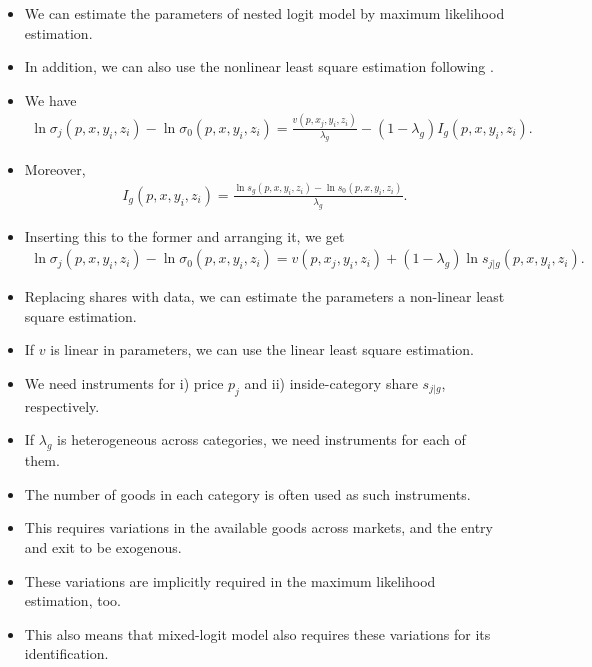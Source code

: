 \documentclass[
]{book}
\providecommand{\tightlist}{%
  \setlength{\itemsep}{0pt}\setlength{\parskip}{0pt}}
\begin{document}
\begin{itemize}
\tightlist
\item
  We can estimate the parameters of nested logit model by maximum likelihood estimation.
\item
  In addition, we can also use the nonlinear least square estimation following \citet{berryEstimatingDiscreteChoiceModels1994}.
\item
  We have
  \begin{equation}
  \begin{split}
  \ln \sigma_{j}(p, x, y_i, z_i) - \ln \sigma_{0}(p, x, y_i, z_i) = \frac{v(p, x_j, y_i, z_i)}{\lambda_g} - (1 - \lambda_g) I_g(p, x, y_i, z_i).
  \end{split}
  \end{equation}
\item
  Moreover,
  \begin{equation}
  \begin{split}
  I_g(p, x, y_i, z_i) = \frac{\ln s_g(p, x, y_i, z_i) - \ln s_0(p, x, y_i, z_i)}{\lambda_g}.
  \end{split}
  \end{equation}
\item
  Inserting this to the former and arranging it, we get
  \begin{equation}
  \begin{split}
  \ln \sigma_{j}(p, x, y_i, z_i) - \ln \sigma_{0}(p, x, y_i, z_i) = v(p, x_j, y_i, z_i) + (1 - \lambda_g) \ln s_{j|g}(p, x, y_i, z_i).
  \end{split}
  \end{equation}
\item
  Replacing shares with data, we can estimate the parameters a non-linear least square estimation.
\item
  If \(v\) is linear in parameters, we can use the linear least square estimation.
\item
  We need instruments for i) price \(p_j\) and ii) inside-category share \(s_{j|g}\), respectively.
\item
  If \(\lambda_g\) is heterogeneous across categories, we need instruments for each of them.
\item
  The number of goods in each category is often used as such instruments.
\item
  This requires variations in the available goods across markets, and the entry and exit to be exogenous.
\item
  These variations are implicitly required in the maximum likelihood estimation, too.
\item
  This also means that mixed-logit model also requires these variations for its identification.
\end{itemize}
\end{document}
